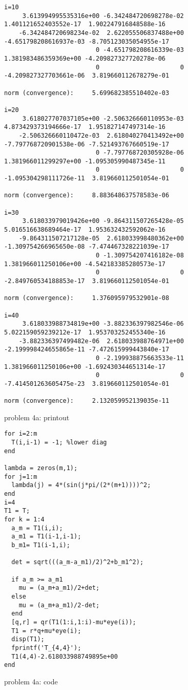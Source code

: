 \documentclass[10pt]{article}
\begin{document}
\begin{program}
 \begin{verbatim}
i=10
     3.613994995535316e+00 -6.342484720698278e-02   1.401121652403552e-17  1.902247916848588e-16
    -6.342484720698234e-02  2.622055506837488e+00  -4.651798208616937e-03 -8.705123035054955e-17
                         0 -4.651798208616339e-03   1.381983486359369e+00 -4.209827327720278e-06
                         0                      0  -4.209827327703661e-06  3.819660112678279e-01

norm (convergence):     5.699682385510402e-03

i=20
     3.618027707037105e+00 -2.506326660110953e-03   4.873429373194666e-17  1.951827147497314e-16
    -2.506326660110472e-03  2.618040270413492e+00  -7.797768720901538e-06 -7.521493767660519e-17
                         0 -7.797768720305928e-06   1.381966011299297e+00 -1.095305990487345e-11
                         0                      0  -1.095304298111726e-11  3.819660112501054e-01

norm (convergence):     8.883648637578583e-06

i=30
     3.618033979019426e+00 -9.864311507265428e-05   5.016516638689464e-17  1.953632432592062e-16
    -9.864311507217128e-05  2.618033998480362e+00  -1.309754266965650e-08 -7.474467328221039e-17
                         0 -1.309754207416182e-08   1.381966011250106e+00 -4.542183385280573e-17
                         0                      0  -2.849760534188853e-17  3.819660112501054e-01

norm (convergence):     1.376095979532901e-08

i=40
     3.618033988734819e+00 -3.882336397982546e-06   5.022159059239212e-17  1.953703252455340e-16
    -3.882336397499482e-06  2.618033988764971e+00  -2.199998424655865e-11 -7.472615999443840e-17
                         0 -2.199938875663533e-11   1.381966011250106e+00 -1.692430344651314e-17
                         0                      0  -7.414501263605475e-23  3.819660112501054e-01

norm (convergence):     2.132059952139035e-11
  \end{verbatim}
\caption{problem 4a: printout}
\end{program}


\begin{program}
 \begin{verbatim}
for i=2:m
  T(i,i-1) = -1; %lower diag
end

lambda = zeros(m,1);
for j=1:m
  lambda(j) = 4*(sin(j*pi/(2*(m+1))))^2;
end
i=4
T1 = T;
for k = 1:4
  a_m = T1(i,i);
  a_m1 = T1(i-1,i-1);
  b_m1= T1(i-1,i);

  det = sqrt(((a_m-a_m1)/2)^2+b_m1^2);

  if a_m >= a_m1
    mu = (a_m+a_m1)/2+det;
  else
    mu = (a_m+a_m1)/2-det;
  end
  [q,r] = qr(T1(1:i,1:i)-mu*eye(i));
  T1 = r*q+mu*eye(i);
  disp(T1);
  fprintf('T_{4,4}');
  T1(4,4)-2.618033988749895e+00
end
  \end{verbatim}
\caption{problem 4a: code}
\end{program}
\end{document}
